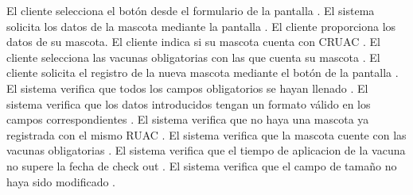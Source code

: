 \begin{UCtrayectoria}
	\UCpaso[\UCactor] \label{UC3.detonante} El cliente selecciona  el botón  desde el formulario de la pantalla .
	\UCpaso [\UCsist] \label{UC3.formulario} El sistema solicita los datos de la mascota mediante la pantalla  .
	\UCpaso [\UCactor] \label{UC3.datos de la mascota} El cliente proporciona los datos de su mascota.
	\UCpaso [\UCactor] \label{UC3.CRUAC} El cliente indica si su mascota cuenta con CRUAC .
	\UCpaso [\UCactor] \label{UC3.vacunas obligatorias} El cliente selecciona las vacunas obligatorias con las que cuenta su mascota .
	 \UCpaso[\UCactor] \label{UC3.solictar registrar} El cliente solicita el registro de la nueva mascota mediante el botón  de la pantalla .
\UCpaso[\UCsist]\label {UC3.verificacion campo obligatorio}El sistema verifica que todos los campos obligatorios se hayan llenado .   
\UCpaso[\UCsist] \label{UC3.verificacion formato invalido} El sistema verifica que los datos introducidos tengan un formato válido en los campos correspondientes .
\UCpaso[\UCsist] \label{UC3.verificacion RUAC} El sistema verifica que no haya una mascota ya registrada con el mismo RUAC .
\UCpaso[\UCsist] \label{UC3.verificacion vacunas obligatorias} El sistema verifica que la mascota cuente con las vacunas obligatorias .
\UCpaso[\UCsist] \label{UC3.verificacion duracion vacuna} El sistema verifica que el tiempo de aplicacion de la vacuna no supere la fecha de check out .
\UCpaso[\UCsist] \label{UC3.verificacion tamaño} El sistema verifica que el campo de tamaño no haya sido modificado .

\end{UCtrayectoria}
